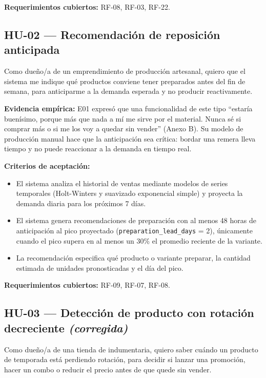 \noindent\textbf{Requerimientos cubiertos:} RF-08, RF-03, RF-22.

\subsection{HU-02 --- Recomendación de reposición anticipada}
\label{sec:hu-02}

Como dueño/a de un emprendimiento de producción artesanal, quiero que el sistema me indique qué productos conviene tener preparados antes del fin de semana, para anticiparme a la demanda esperada y no producir reactivamente.

\noindent\textbf{Evidencia empírica:} E01 expresó que una funcionalidad de este tipo \enquote{estaría buenísimo, porque más que nada a mí me sirve por el material. Nunca sé si comprar más o si me los voy a quedar sin vender} (Anexo B). Su modelo de producción manual hace que la anticipación sea crítica: bordar una remera lleva tiempo y no puede reaccionar a la demanda en tiempo real.

\noindent\textbf{Criterios de aceptación:}
\begin{itemize}
    \item El sistema analiza el historial de ventas mediante modelos de series temporales (Holt-Winters y suavizado exponencial simple) y proyecta la demanda diaria para los próximos 7 días.
    \item El sistema genera recomendaciones de preparación con al menos 48 horas de anticipación al pico proyectado (\texttt{preparation\_lead\_days} = 2), únicamente cuando el pico supera en al menos un 30\% el promedio reciente de la variante.
    \item La recomendación especifica qué producto o variante preparar, la cantidad estimada de unidades pronosticadas y el día del pico.
\end{itemize}

\noindent\textbf{Requerimientos cubiertos:} RF-09, RF-07, RF-08.

\subsection{HU-03 --- Detección de producto con rotación decreciente \textit{(corregida)}}
\label{sec:hu-03}

Como dueño/a de una tienda de indumentaria, quiero saber cuándo un producto de temporada está perdiendo rotación, para decidir si lanzar una promoción, hacer un combo o reducir el precio antes de que quede sin vender.

